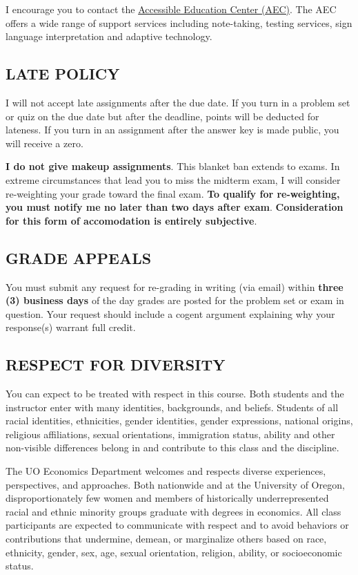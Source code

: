 \documentclass[11pt]{article}
\begin{document}
I encourage you to contact the \href{https://aec.uoregon.edu/}{Accessible Education Center (AEC)}. The AEC offers a wide range of support services including note-taking, testing services, sign language interpretation and adaptive technology.

\subsection*{LATE POLICY}
I will not accept late assignments after the due date. 
If you turn in a problem set or quiz on the due date but after the deadline, points will be deducted for lateness. 
If you turn in an assignment after the answer key is made public, you will receive a zero. 

\textbf{I do not give makeup assignments}. 
This blanket ban extends to exams. 
In extreme circumstances that lead you to miss the midterm exam, I will consider re-weighting your grade toward the final exam. 
\textbf{To qualify for re-weighting, you must notify me no later than two days after exam}.
\textbf{Consideration for this form of accomodation is entirely subjective}. 

\subsection*{GRADE APPEALS}
You must submit any request for re-grading in writing (via email) within \textbf{three (3) business days} of the day grades are posted for the problem set or exam in question. 
Your request should include a cogent argument explaining why your response(s) warrant full credit. 

\subsection*{RESPECT FOR DIVERSITY}
You can expect to be treated with respect in this course.
Both students and the instructor enter with many identities, backgrounds, and beliefs.
Students of all racial identities, ethnicities, gender identities, gender expressions, national origins, religious affiliations, sexual orientations, immigration status, ability and other non-visible differences belong in and contribute to this class and the discipline.

The UO Economics Department welcomes and respects diverse experiences, perspectives, and approaches. 
Both nationwide and at the University of Oregon, disproportionately few women and members of historically underrepresented racial and ethnic minority groups graduate with degrees in economics. 
All class participants are expected to communicate with respect and to avoid behaviors or contributions that undermine, demean, or marginalize others based on race, ethnicity, gender, sex, age, sexual orientation, religion, ability, or socioeconomic status.
\end{document}
